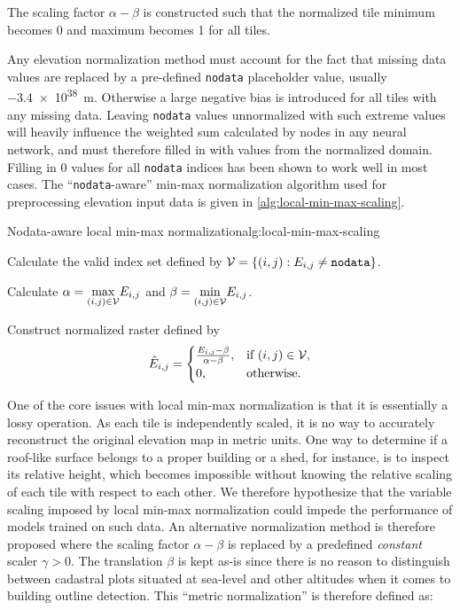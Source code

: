 The scaling factor $\alpha - \beta$ is constructed such that the normalized tile minimum becomes 0 and maximum becomes 1 for all tiles.

Any elevation normalization method must account for the fact that missing data values are replaced by a pre-defined \texttt{nodata} placeholder value, usually \SI{-3.4e38}{\meter}.
Otherwise a large negative bias is introduced for all tiles with any missing data.
Leaving \texttt{nodata} values unnormalized with such extreme values will heavily influence the weighted sum calculated by nodes in any neural network, and must therefore filled in with values from the normalized domain.
Filling in $0$ values for all \texttt{nodata} indices has been shown to work well in most cases.
The \enquote{\texttt{nodata}-aware} min-max normalization algorithm used for preprocessing elevation input data is given in \cref{alg:local-min-max-scaling}.

\begin{algorithm}{Nodata-aware local min-max normalization}{alg:local-min-max-scaling}
  \item Calculate the valid index set defined by $\mathcal{V} = \{(i, j): E_{i,j} \neq \texttt{nodata}\}$.
  \item Calculate $\alpha = \underset{(i,j) \in \mathcal{V}}{\max} E_{i,j}$ and $\beta = \underset{(i,j) \in \mathcal{V}}{\min} E_{i,j}$.
  \item Construct normalized raster defined by
    \begin{equation*}
        \hat{E}_{i,j} = \begin{cases}
          \frac{E_{i,j} - \beta}{\alpha - \beta}, & \text{if } (i,j) \in \mathcal{V}, \\
          0, & \text{otherwise.}
        \end{cases}
    \end{equation*}
\end{algorithm}

One of the core issues with local min-max normalization is that it is essentially a lossy operation.
As each tile is independently scaled, it is no way to accurately reconstruct the original elevation map in metric units.
One way to determine if a roof-like surface belongs to a proper building or a shed, for instance, is to inspect its relative height, which becomes impossible without knowing the relative scaling of each tile with respect to each other.
We therefore hypothesize that the variable scaling imposed by local min-max normalization could impede the performance of models trained on such data.
An alternative normalization method is therefore proposed where the scaling factor $\alpha - \beta$ is replaced by a predefined \textit{constant} scaler $\gamma > 0$.
The translation $\beta$ is kept as-is since there is no reason to distinguish between cadastral plots situated at sea-level and other altitudes when it comes to building outline detection.
This \enquote{metric normalization} is therefore defined as:

